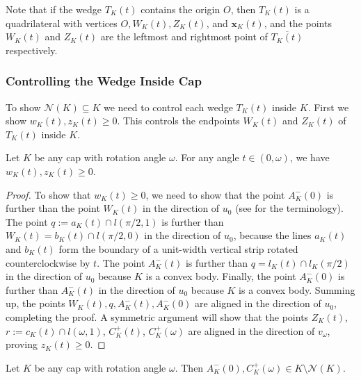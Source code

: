Note that if the wedge \(T_K(t)\) contains the origin \(O\), then \(T_K(t)\) is a quadrilateral with vertices \(O, W_K(t), Z_K(t)\), and \(\mathbf{x}_K(t)\), and the points \(W_K(t)\) and \(Z_K(t)\) are the leftmost and rightmost point of \(\overline{T_K(t)}\) respectively.

\subsubsection{Controlling the Wedge Inside Cap}

To show \(\mathcal{N}(K) \subseteq K\) we need to control each wedge \(T_K(t)\) inside \(K\). First we show \(w_K(t), z_K(t) \geq 0\). This controls the endpoints \(W_K(t)\) and \(Z_K(t)\) of \(T_K(t)\) inside \(K\).

\begin{lemma}

Let \(K\) be any cap with rotation angle \(\omega\). For any angle \(t \in (0, \omega)\), we have \(w_K(t), z_K(t) \geq 0\).

\label{lem:wedge-ends-in-cap}
\end{lemma}

\begin{proof}
To show that \(w_K(t) \geq 0\), we need to show that the point \(A_K^-(0)\) is further than the point \(W_K(t)\) in the direction of \(u_0\) (see  for the terminology). The point \(q := a_K(t) \cap l(\pi/2, 1)\) is further than \(W_K(t) = b_K(t) \cap l(\pi/2, 0)\) in the direction of \(u_0\), because the lines \(a_K(t)\) and \(b_K(t)\) form the boundary of a unit-width vertical strip rotated counterclockwise by \(t\). The point \(A^-_K(t)\) is further than \(q = l_K(t) \cap l_K(\pi/2)\) in the direction of \(u_0\) because \(K\) is a convex body. Finally, the point \(A^-_K(0)\) is further than \(A_K^-(t)\) in the direction of \(u_0\) because \(K\) is a convex body. Summing up, the points \(W_K(t), q, A_K^-(t), A_K^-(0)\) are aligned in the direction of \(u_0\), completing the proof. A symmetric argument will show that the points \(Z_K(t)\), \(r := c_K(t) \cap l(\omega, 1)\), \(C_K^+(t)\), \(C_K^+(\omega)\) are aligned in the direction of \(v_\omega\), proving \(z_K(t) \geq 0\).
\end{proof}

\begin{corollary}

Let \(K\) be any cap with rotation angle \(\omega\). Then \(A^-_K(0), C^+_K(\omega) \in K \setminus \mathcal{N}(K)\).

\label{cor:cap-ends-not-in-niche}
\end{corollary}

